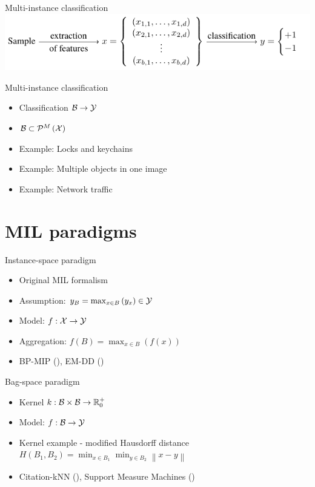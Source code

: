 \documentclass[10pt]{beamer}
\newcommand{\mathspace}{\ensuremath{\mathcal}}
\newcommand{\mathfield}{\ensuremath{\mathbb}}
\begin{document}
\begin{frame}{Multi-instance classification}
	\centering
	\includegraphics{images/multi_instance_learning/multi_instance_learning.pdf}
\end{frame}

\begin{frame}{Multi-instance classification}
	\begin{itemize}
		\item Classification \( \mathspace{B} \to \mathspace{Y} \)
		\item \( \mathspace{B} \subset \mathcal{P}^M \left( \mathspace{X} \right) \)
		\item Example: Locks and keychains
		\item Example: Multiple objects in one image
		\item Example: Network traffic
	\end{itemize}
\end{frame}

\section{MIL paradigms}

\begin{frame}{Instance-space paradigm}
	\begin{itemize}
		\item Original MIL formalism
		\item Assumption: \( y_B = \max_{x \in B} \left( y_x \right) \in \mathspace{Y} \)
		\item Model: \( f : \mathspace{X} \to \mathspace{Y} \)
		\item Aggregation: \( f \left( B \right) = \max_{x \in B} \left( f \left( x \right) \right) \)
		\item BP-MIP (\cite{zhou_neural_2002}), EM-DD (\cite{zhang_em-dd:_2002})
	\end{itemize}
\end{frame}

\begin{frame}{Bag-space paradigm}
	\begin{itemize}
		\item Kernel \( k : \mathspace{B} \times \mathspace{B} \to \mathfield{R}_0^+ \)
		\item Model: \( f : \mathspace{B} \to \mathspace{Y} \)
		\item Kernel example - modified Hausdorff distance \( H \left( B_1, B_2 \right) = \min_{x \in B_1} \min_{y \in B_2} \left\lVert x - y \right\rVert \)
		\item Citation-kNN (\cite{wang_solving_2000}), Support Measure Machines (\cite{muandet_learning_2012})
	\end{itemize}
\end{frame}
\end{document}

